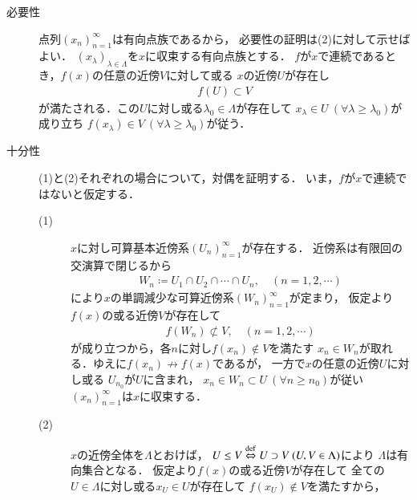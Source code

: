 	\begin{prf}\mbox{}
		\begin{description}
			\item[必要性]
				点列$(x_n)_{n=1}^{\infty}$は有向点族であるから，
				必要性の証明は(2)に対して示せばよい．
				$(x_\lambda)_{\lambda \in \Lambda}$を$x$に収束する有向点族とする．
				$f$が$x$で連続であるとき，$f(x)$の任意の近傍$V$に対して或る
				$x$の近傍$U$が存在し
				\begin{align}
					f(U) \subset V
				\end{align}
				が満たされる．この$U$に対し或る$\lambda_0 \in \Lambda$が存在して
				$x_\lambda \in U\ (\forall \lambda \geq \lambda_0)$が成り立ち
				$f(x_\lambda) \in V\ (\forall \lambda \geq \lambda_0)$が従う．
				
			\item[十分性] (1)と(2)それぞれの場合について，対偶を証明する．
				いま，$f$が$x$で連続ではないと仮定する．
				\begin{description}
					\item[(1)]
						$x$に対し可算基本近傍系$(U_n)_{n=1}^{\infty}$が存在する．
						近傍系は有限回の交演算で閉じるから
						\begin{align}
							W_n \coloneqq U_1 \cap U_2 \cap \cdots \cap U_n,
							\quad (n=1,2,\cdots)
						\end{align}
						により$x$の単調減少な可算近傍系$(W_n)_{n=1}^{\infty}$が定まり，
						仮定より$f(x)$の或る近傍$V$が存在して
						\begin{align}
							f(W_n) \not\subset V,
							\quad (n=1,2,\cdots)
						\end{align}
						が成り立つから，各$n$に対し$f(x_n) \notin V$を満たす
						$x_n \in W_n$が取れる．ゆえに$f(x_n) \not\rightarrow f(x)$であるが，
						一方で$x$の任意の近傍$U$に対し或る
						$U_{n_0}$が$U$に含まれ，
						$x_n \in W_n \subset U\ (\forall n \geq n_0)$が従い
						$(x_n)_{n=1}^{\infty}$は$x$に収束する．
					\item[(2)]
						$x$の近傍全体を$\Lambda$とおけば，
						$U \leq V \DEF U \supset V\ (U,V \in \Lambda)$により
						$\Lambda$は有向集合となる．
						仮定より$f(x)$の或る近傍$V$が存在して
						全ての$U \in \Lambda$に対し或る$x_U \in U$が存在して
						$f(x_U) \notin V$を満たすから，
						$$
				\end{description}
		\end{description}
	\end{prf}
	